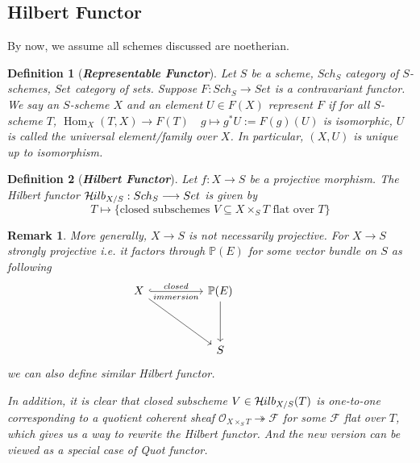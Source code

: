 \documentclass{ctexart}
\newtheorem{definition}{Definition}[section]
\newtheorem{remark}{Remark}[section]
\renewcommand{\hom}{\operatorname{Hom}}
\newcommand{\hilbertfunctor}{\mathcal{H}\kern -.5pt ilb}
\begin{document}
\subsection{Hilbert Functor}
\label{subsection:Hilbert Functor}
By now, we assume all schemes discussed are noetherian.
\begin{definition}[\textbf{\emph{Representable Functor}}]
    Let $S$ be a scheme, $Sch_{S}$ category of $S$-schemes, $Set$ category of sets.
    Suppose $F: Sch_{S} \longrightarrow Set$ is a contravariant functor.
    We say an $S$-scheme $X$ and an element $U\in F(X)$ represent $F$ if for all $S$-scheme $T$, 
    $\hom_{X}(T, X) \longrightarrow F(T)\quad g \longmapsto g^{\ast}U := F(g)(U)$ is isomorphic, 
    $U$ is called the universal element/family over $X$.
    In particular, $(X, U)$ is unique up to isomorphism.
\end{definition}
\begin{definition}[\textbf{\emph{Hilbert Functor}}]
    Let $f: X \longrightarrow S$ be a projective morphism.
    The Hilbert functor $\hilbertfunctor_{X/S}: Sch_{S} \longrightarrow Set$ is given by
    \begin{equation*}
        T \longmapsto \{\text{closed subschemes $V \subseteq X \times_{S} T$ flat over $T$}\}
    \end{equation*}
\end{definition}
\begin{remark}
    More generally, $X \longrightarrow S$ is not necessarily projective.
    For $X \longrightarrow S$ strongly projective i.e. it factors through $\mathbb{P}(E)$ for some vector bundle on $S$ as following
    \begin{equation*}
        \begin{tikzcd}[sep = huge]
            X \arrow[r, hookrightarrow, "closed", "immersion" swap] \arrow[dr] &
            \mathbb{P}(E) \arrow[d] \\
            & S &
        \end{tikzcd}
    \end{equation*}
    we can also define similar Hilbert functor.
    \par
    In addition, it is clear that closed subscheme $V\in \hilbertfunctor_{X/S}(T)$ is one-to-one corresponding to a quotient coherent sheaf $\mathcal{O}_{X \times_{S} T} \twoheadrightarrow \mathcal{F}$ for some $\mathcal{F}$ flat over $T$,
    which gives us a way to rewrite the Hilbert functor.
    And the new version can be viewed as a special case of Quot functor.
\end{remark}
\end{document}

